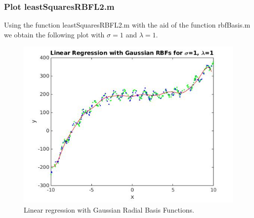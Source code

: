 \documentclass[11pt]{article}
\theoremstyle{plain}
\begin{document}
\subsubsection{Plot leastSquaresRBFL2.m}
Using the function leastSquaresRBFL2.m with the aid of the function rbfBasis.m
 we obtain the following plot with $\sigma=1$ and $\lambda=1$.
\begin{figure}[H]
\centering
\includegraphics[scale=0.5]{./Q12/RBFs1l1plot}
\caption{Linear regression with Gaussian Radial Basis Functions.}
\label{figRBFregression}
\end{figure}
\end{document}
